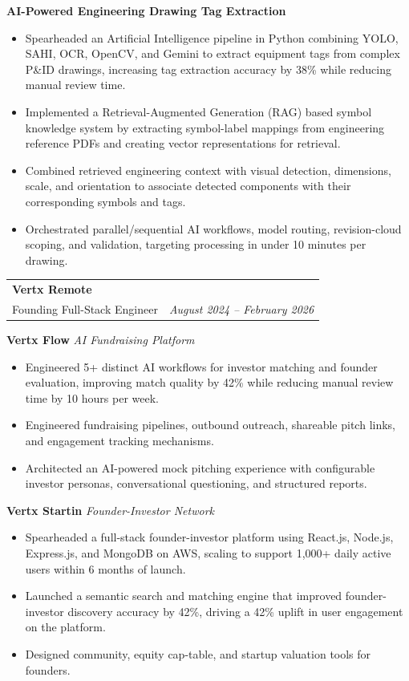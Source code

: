 \documentclass[a4paper,10pt]{article}
\makeatletter
\newcommand{\resumeSubheading}[4]{
  \vspace{2.5pt}\nopagebreak[3]
  \begin{tabular*}{1.0\textwidth}[t]{l@{\extracolsep{\fill}}r}
    \textbf{#1} & \textit{\small #2} \\[-1.5pt]
    {\small #3} & \textit{\small #4}
  \end{tabular*}\nopagebreak[4]
}
\makeatother
\begin{document}
\noindent \textbf{AI-Powered Engineering Drawing Tag Extraction}
\vspace{1pt}
\begin{itemize}[leftmargin=1.2em, itemsep=0.6pt, parsep=0pt, topsep=1.0pt, partopsep=0pt, label=\textbullet]
  \item Spearheaded an Artificial Intelligence pipeline in Python combining YOLO, SAHI, OCR, OpenCV, and Gemini to extract equipment tags from complex P\&ID drawings, increasing tag extraction accuracy by 38\% while reducing manual review time.
  \item Implemented a Retrieval-Augmented Generation (RAG) based symbol knowledge system by extracting symbol-label mappings from engineering reference PDFs and creating vector representations for retrieval.
  \item Combined retrieved engineering context with visual detection, dimensions, scale, and orientation to associate detected components with their corresponding symbols and tags.
  \item Orchestrated parallel/sequential AI workflows, model routing, revision-cloud scoping, and validation, targeting processing in under 10 minutes per drawing.
\end{itemize}
\resumeSubheading
  {Vertx Remote}{}
  {Founding Full-Stack Engineer}{August 2024 -- February 2026}
\vspace{2.0pt}
\noindent \textbf{Vertx Flow} \enspace\textbar\enspace \textit{AI Fundraising Platform}
\vspace{1pt}
\begin{itemize}[leftmargin=1.2em, itemsep=0.6pt, parsep=0pt, topsep=1.0pt, partopsep=0pt, label=\textbullet]
  \item Engineered 5+ distinct AI workflows for investor matching and founder evaluation, improving match quality by 42\% while reducing manual review time by 10 hours per week.
  \item Engineered fundraising pipelines, outbound outreach, shareable pitch links, and engagement tracking mechanisms.
  \item Architected an AI-powered mock pitching experience with configurable investor personas, conversational questioning, and structured reports.
\end{itemize}
\vspace{2.0pt}
\noindent \textbf{Vertx Startin} \enspace\textbar\enspace \textit{Founder-Investor Network}
\vspace{1pt}
\begin{itemize}[leftmargin=1.2em, itemsep=0.6pt, parsep=0pt, topsep=1.0pt, partopsep=0pt, label=\textbullet]
  \item Spearheaded a full-stack founder-investor platform using React.js, Node.js, Express.js, and MongoDB on AWS, scaling to support 1,000+ daily active users within 6 months of launch.
  \item Launched a semantic search and matching engine that improved founder-investor discovery accuracy by 42\%, driving a 42\% uplift in user engagement on the platform.
  \item Designed community, equity cap-table, and startup valuation tools for founders.
\end{itemize}
\end{document}
